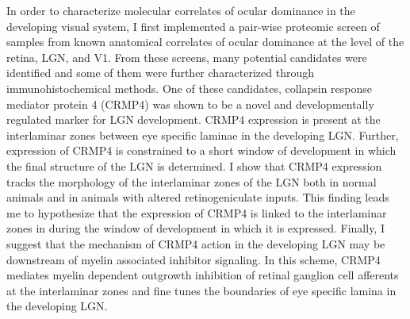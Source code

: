 \documentclass[12pt]{report}
\begin{document}
In order to characterize molecular correlates of ocular dominance in the developing visual system, I first implemented a pair-wise proteomic screen of samples from known anatomical correlates of ocular dominance at the level of the retina, LGN, and V1.  From these screens, many potential candidates were identified and some of them were further characterized through immunohistochemical methods. One of these candidates, collapsin response mediator protein 4 (CRMP4) was shown to be a novel and developmentally regulated marker for LGN development.  CRMP4 expression is present at the interlaminar zones between eye specific laminae in the developing LGN.  Further, expression of CRMP4 is constrained to a short window of development in which the final structure of the LGN is determined.  I show that CRMP4 expression tracks the morphology of the interlaminar zones of the LGN both in normal animals and in animals with altered retinogeniculate inputs.  This finding leads me to hypothesize that the expression of CRMP4 is linked to the interlaminar zones in during the window of development in which it is expressed.  Finally, I suggest that the mechanism of CRMP4 action in the developing LGN may be downstream of myelin associated inhibitor signaling. In this scheme, CRMP4 mediates myelin dependent outgrowth inhibition of retinal ganglion cell afferents at the interlaminar zones and fine tunes the boundaries of eye specific lamina in the developing LGN.\\
\end{document}

